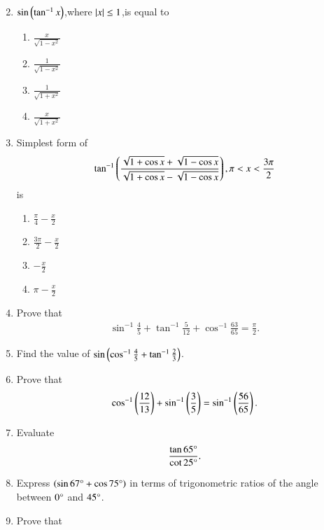 \begin{enumerate}[label=\thesubsection.\arabic*,ref=\thesubsection.\theenumi,itemsep=1pt]
\begin{multicols}{4}
\end{multicols}
\hfill{}\item $ \sin\left(\tan^{-1}x\right)$,where $\left\vert x\right\vert \le 1 $,is equal to
\begin{multicols}{4}
\begin{enumerate}
\item$\frac{x}{\sqrt{1-x^2}}$
\item$\frac{1}{\sqrt{1-x^2}}$ 
\item$\frac{1}{\sqrt{1+x^2}}$
\item$\frac{x}{\sqrt{1+x^2}}$
\end{enumerate}
\end{multicols}  
\hfill{}\item Simplest form of $$ \tan^{-1}\left(\frac{\sqrt{1+\cos x}+\sqrt{1-\cos x}}{\sqrt{1+\cos x}- \sqrt {1- \cos x}}\right) , \pi < x < \frac{3\pi}{2}$$ is
\begin{multicols}{4}
\begin{enumerate}
  \item$\frac{\pi}{4} - \frac{x}{2}$
  \item$\frac{3\pi}{2} - \frac{x}{2}$
  \item$-\frac{x}{2}$
  \item${\pi} - \frac{x}{2}$
\end{enumerate}
\end{multicols}
\hfill{}
\item Prove that 
\begin{align*}
    \sin^{-1}\frac{4}{5}+\tan^{-1}\frac{5}{12}+\cos^{-1}\frac{63}{65}=\frac{\pi}{2}
.\end{align*}
\hfill{}
\item Find the value of $\sin\left(\cos^{-1}{\frac{4}{5}}+{\tan^{-1}{\frac{2}{3}}}\right)$.
\hfill{}
\item Prove that 
\begin{align*}
\cos^{-1}\left(\frac{12}{13}\right)+\sin^{-1}\left(\frac{3}{5}\right)=\sin^{-1} \left(\frac{56}{65}\right)
.\end{align*}
\hfill{}
\item  Evaluate
\begin{align*}
    \frac {\tan 65\degree}  {\cot 25\degree}
.\end{align*}
\hfill{}\item Express $\left({\sin 67\degree}+ {\cos 75\degree}\right)$ in terms of trigonometric ratios of the angle between $0\degree$ and $45\degree$.
\hfill{}\item Prove that 

\end{enumerate}
